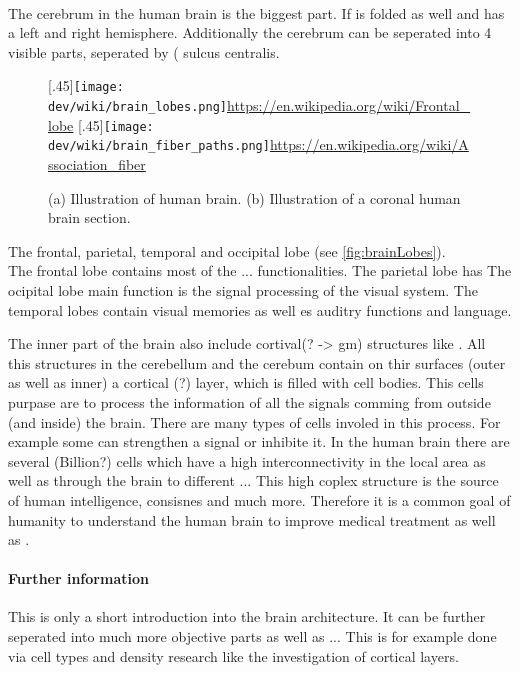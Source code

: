\\
The cerebrum in the human brain is the biggest part.
If is folded as well and has a left and right hemisphere.
Additionally the cerebrum can be seperated into 4 visible parts, seperated by \dummy{} (\eg{} sulcus centralis.
% 
\begin{figure}[!t]
\centering
\hspace*{\fill}
\subcaptionbox{\label{fig:brainLobes}}[.45\textwidth]{\texttt{[image: dev/wiki/brain\_lobes.png]}\url{https://en.wikipedia.org/wiki/Frontal_lobe}}
\hspace*{\fill}
\subcaptionbox{\label{fig:nerveFiber}}[.45\textwidth]{\texttt{[image: dev/wiki/brain\_fiber\_paths.png]}\url{https://en.wikipedia.org/wiki/Association_fiber}}
\hspace*{\fill}
\caption{(a) Illustration of human brain. (b) Illustration of a coronal human brain section.}
\label{fig:human-fiber}
\end{figure}
% 
The frontal, parietal, temporal  and occipital lobe (see \cref{fig:brainLobes}).
\\
The frontal lobe contains most of the ... functionalities.
The parietal lobe has \dummy{}
The ocipital lobe main function is the signal processing of the visual system.
The temporal lobes contain visual memories as well es auditry functions and language.
\par
The inner part of the brain also include cortival(? -> gm) structures like \dummy{}.
All this structures in the cerebellum and the cerebum contain on thir surfaces (outer as well as inner) a cortical (?) layer, which is filled with cell bodies.
This cells purpase are to process the information of all the signals comming from outside (and inside) the brain.
There are many types of cells involed in this process.
For example some can strengthen a signal or inhibite it.
In the human brain there are several (Billion?) cells which have a high interconnectivity in the local area as well as through the brain to different ...
This high coplex structure is the source of human intelligence, consisnes and much more.
Therefore it is a common goal of humanity to understand the human brain to improve medical treatment as well as \dummy{}.
% 
\paragraph{Further information}
This is only a short introduction into the brain architecture.
It can be further seperated into much more objective parts as well as ...
This is for example done via cell types and density research like the investigation of cortical layers.
% 
% 
% 
